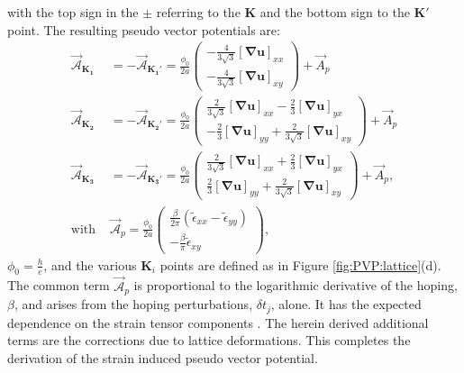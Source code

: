 with the top sign in the $\pm$ referring to the $\bm{K}$ and the bottom sign to the $\bm{K'}$ point.
The resulting pseudo vector potentials are:
\begin{align}
  \vec{\mathcal{A}}_{\bm{K_1}}&=-\vec{\mathcal{A}}_{\bm{K_1'}}=
    \frac{\phi_0}{2a} \left( \begin{array}{c} 
      -\frac{4}{3\sqrt{3}} [\bm{\nabla u}]_{xx} \\ 
      -\frac{4}{3\sqrt{3}} [\bm{\nabla u}]_{xy}
    \end{array} \right) +\vec{A}_p \nonumber \\ 
  \vec{\mathcal{A}}_{\bm{K_2}}&=-\vec{\mathcal{A}}_{\bm{K_2'}}=
    \frac{\phi_0}{2a} \left( \begin{array}{c} 
      \frac{2}{3\sqrt{3}}[\bm{\nabla u}]_{xx}-\frac{2}{3} [\bm{\nabla u}]_{yx} \\
      -\frac{2}{3} [\bm{\nabla u}]_{yy}+\frac{2}{3 \sqrt{3}} [\bm{\nabla u}]_{xy}
    \end{array} \right)+\vec{A}_p  \nonumber \\
  \vec{\mathcal{A}}_{\bm{K_3}}&=-\vec{\mathcal{A}}_{\bm{K_3'}}=
    \frac{\phi_0}{2a} \left( \begin{array}{c}
      \frac{2}{3\sqrt{3}}[\bm{\nabla u}]_{xx}+\frac{2}{3} [\bm{\nabla u}]_{yx} \\
      \frac{2}{3} [\bm{\nabla u}]_{yy}+\frac{2}{3 \sqrt{3}} [\bm{\nabla u}]_{xy}
    \end{array} \right)+\vec{A}_p  , \nonumber \\
  \textrm{with }
  &\vec{\mathcal{A}}_p= 
    \frac{\phi_0}{2a} \left( \begin{array}{c} 
      \frac{\beta }{2 \pi} (\tilde{\epsilon}_{xx}-\tilde{\epsilon}_{yy}) \\
      -\frac{\beta}{\pi} \tilde{\epsilon}_{xy}
    \end{array} \right),
  \label{eq:PVP:PVP}
\end{align}
$\phi_0=\frac{h}{e}$, and the various $\bm{K}_i$ points are defined as in Figure \ref{fig:PVP:lattice}(d).
The common term $\vec{\mathcal{A}}_p$ is proportional to the logarithmic derivative of the hoping, $\beta$, and arises from the hoping perturbations, $\delta t_j$, alone.
It has the expected dependence on the strain tensor components \cite{CastroNeto2009,Vozmediano2010}. 
The herein derived additional terms are the corrections due to lattice deformations.
This completes the derivation of the strain induced pseudo vector potential.

